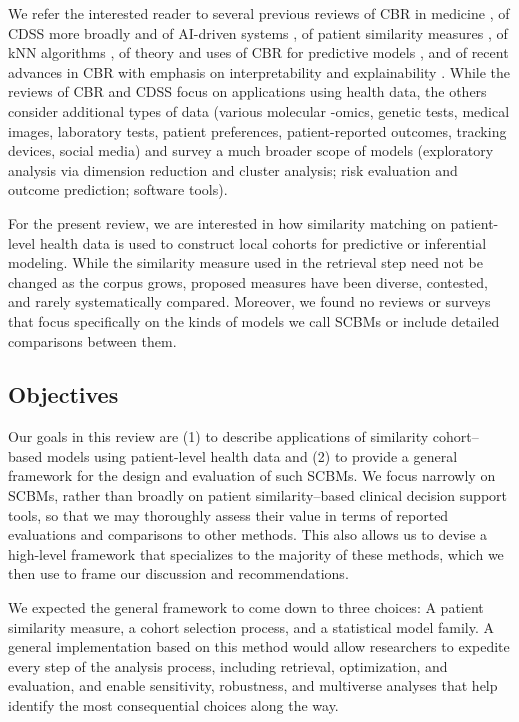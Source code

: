 \documentclass[sn-mathphys,Numbered,pdflatex]{sn-jnl}
\theoremstyle{remark}
\theoremstyle{definition}
\newcommand{\hl}[1]{#1}
\begin{document}
We refer the interested reader to several previous reviews of CBR in
medicine
\citep{Gierl1998, Begum2011, Choudhury2016}\hl{, of CDSS more broadly }\citep{Wasylewicz2019}\hl{ and of AI-driven systems }\citep{Elhaddad2024},
\hl{of patient similarity measures}
\citep{Dai2020}\hl{, of kNN algorithms }\citep{Halder2024},
\hl{of theory and uses of CBR for} predictive models
\citep{Welch2013, Sharafoddini2017, Parimbelli2018, Badra2023}\hl{, and of recent advances in CBR with emphasis on interpretability and explainability }\citep{Schoenborn2021, Rudin2022}.
While the reviews of CBR \hl{and CDSS }focus on applications using
health data, the \hl{others consider }additional types of data (various
molecular -omics, genetic tests, medical images, laboratory tests,
patient preferences, patient-reported outcomes, tracking devices, social
media) and survey a much broader scope of models (exploratory analysis
via dimension reduction and cluster analysis; risk evaluation and
outcome prediction\hl{; }software tools).

For the present review, we are interested in how similarity matching on
patient-level health data is used to construct local cohorts for
predictive or inferential
modeling.\hl{ While the similarity measure used in the retrieval step need not be changed as the corpus grows, proposed measures have been diverse, contested, and rarely systematically compared. Moreover, we found no reviews or surveys that focus specifically on the kinds of models we call SCBMs or include detailed comparisons between them.}

\subsection{Objectives}\label{objectives}

Our goals in this review are (1) to describe applications of similarity
cohort--based models using patient-level health data and (2) to provide
a general framework for the design and evaluation of such \hl{SCBM}s. We
focus narrowly on \hl{SCBM}s, rather than broadly on patient
similarity--based clinical decision support tools, so that we may
thoroughly assess their value in terms of reported evaluations and
comparisons to other methods. This also allows us to devise a high-level
framework that specializes to the majority of these methods, which we
then use to frame our discussion and recommendations.

We expected the general framework to come down to three choices: A
patient similarity measure, a cohort selection process, and a
statistical model family. A general implementation based on this method
would allow researchers to expedite every step of the analysis process,
including retrieval, optimization, and evaluation, and enable
sensitivity, robustness, and multiverse analyses that help identify the
most consequential choices along the way.
\end{document}
